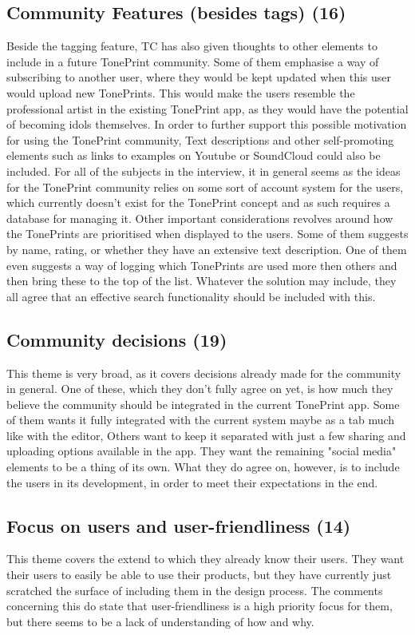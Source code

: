 \subsection*{Community Features (besides tags) (16)}
\label{App:ThemeCommunityFeaturesNotTags}
Beside the tagging feature, TC has also given thoughts to other elements to include in a future TonePrint community. Some of them emphasise a way of subscribing to another user, where they would be kept updated when this user would upload new TonePrints. This would make the users resemble the professional artist in the existing TonePrint app, as they would have the potential of becoming idols themselves. In order to further support this possible motivation for using the TonePrint community, Text descriptions and other self-promoting elements such as links to examples on Youtube or SoundCloud could also be included. For all of the subjects in the interview, it in general seems as the ideas for the TonePrint community relies on some sort of account system for the users, which currently doesn't exist for the TonePrint concept and as such requires a database for managing it. Other important considerations revolves around how the TonePrints are prioritised when displayed to the users. Some of them suggests by name, rating, or whether they have an extensive text description. One of them even suggests a way of logging which TonePrints are used more then others and then bring these to the top of the list. Whatever the solution may include, they all agree that an effective search functionality should be included with this.

\subsection*{Community decisions (19)} 
\label{App:ThemeCommunityDecisions}
This theme is very broad, as it covers decisions already made for the community in general. One of these, which they don't fully agree on yet, is how much they believe the community should be integrated in the current TonePrint app. Some of them wants it fully integrated with the current system maybe as a tab much like with the editor, Others want to keep it separated with just a few sharing and uploading options available in the app. They want the remaining "social media" elements to be a thing of its own. What they do agree on, however, is to include the users in its development, in order to meet their expectations in the end.

\subsection*{Focus on users and user-friendliness (14)} 
\label{App:ThemeFocusOnUsersAndUserFriendliness}
This theme covers the extend to which they already know their users. They want their users to easily be able to use their products, but they have currently just scratched the surface of including them in the design process. The comments concerning this do state that user-friendliness is a high priority focus for them, but there seems to be a lack of understanding of how and why.

